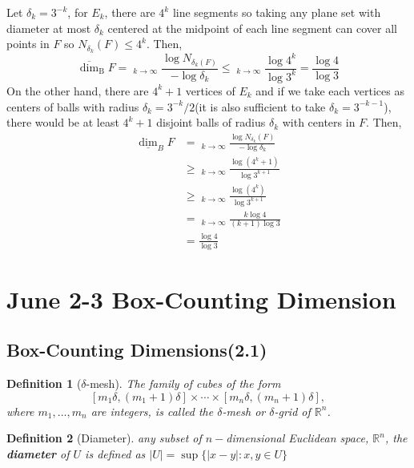 \documentclass[12pt, a4paper]{article}
\DeclareMathOperator*\lowlim{\underline{lim}}
\DeclareMathOperator*\uplim{\overline{lim}}
\newtheorem{definition}{Definition}[subsection]
\begin{document}
\begin{customsol}{2.5}
    Let $\delta_k = 3^{-k}$, for $E_k$, there are $4^k$ line segments so taking any plane set with diameter at most $\delta_k$ centered at the midpoint of each line segment can cover all points in $F$ so $N_{\delta_k}(F)\leq 4^k$. Then,
    $$
    \overline{\operatorname{dim}}_\mathrm{B}F = \uplim_{k\rightarrow\infty} \frac{\log N_{\delta_k(F)}}{-\log \delta_k}\leq \uplim_{k\rightarrow\infty}\frac{\log 4^k}{\log 3^k} = \frac{\log 4}{\log 3}
    $$
    On the other hand, there are $4^k+1$ vertices of $E_k$ and if we take each vertices as centers of balls with radius $\delta_k = 3^{-k}/2$(it is also sufficient to take $\delta_k = 3^{-k-1}$), there would be at least $4^k+1$ disjoint balls of radius $\delta_k$ with centers in $F$. Then,
    $$
    \begin{aligned}
        \underline{\operatorname{dim}}_{B} F &=\lowlim_{k \rightarrow \infty} \frac{\log N_{\delta_{k}}(F)}{-\log \delta_{k}} \\
        & \geq \lowlim_{k \rightarrow \infty} \frac{\log \left(4^{k}+1\right)}{\log 3^{k+1}} \\
        & \geq \lowlim_{k \rightarrow \infty} \frac{\log \left(4^{k}\right)}{\log 3^{k+1}} \\
        & = \lowlim_{k \rightarrow \infty} \frac{k \log 4}{(k+1) \log 3}\\
        & =\frac{\log 4}{\log 3}
        \end{aligned}
    $$
\end{customsol}




\newpage
\section{June 2-3 Box-Counting Dimension}
\subsection{Box-Counting Dimensions(2.1)}

\begin{definition}[$\delta$-mesh]
    The family of cubes of the form
$$
\left[m_{1} \delta,\left(m_{1}+1\right) \delta\right] \times \cdots \times\left[m_{n} \delta,\left(m_{n}+1\right) \delta\right],
$$
where $m_{1}, \ldots, m_{n}$ are integers, is called the $\delta$-mesh or $\delta$-grid of $\mathbb{R}^n$.
\end{definition}

\begin{definition}[Diameter]
    any subset of $n-$dimensional Euclidean space, $\mathbb{R}^n$, the \textbf{diameter} of $U$ is defined as $|U|=\sup \{|x-y|:x, y\in U\}$
\end{definition}
\end{document}
